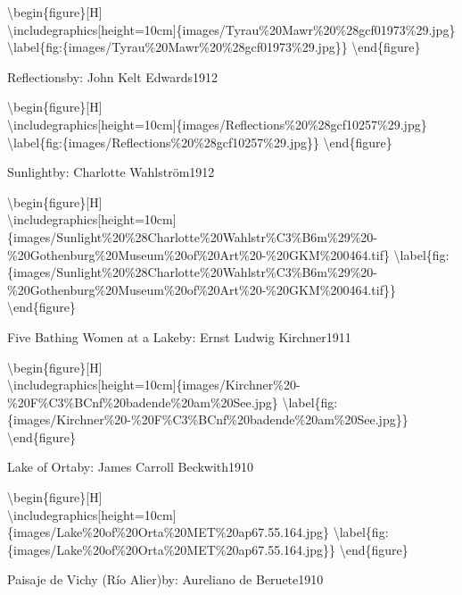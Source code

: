 \documentclass[
  a4paper,
]{book}
\begin{document}
\textbackslash begin\{figure\}{[}H{]}\\
\textbackslash includegraphics{[}height=10cm{]}\{images/Tyrau\%20Mawr\%20\%28gcf01973\%29.jpg\}
\textbackslash label\{fig:\{images/Tyrau\%20Mawr\%20\%28gcf01973\%29.jpg\}\}
\textbackslash end\{figure\}

\label{http:ux2fux2fwww.wikidata.orgux2fentityux2fQ76997813}
Reflectionsby: John Kelt Edwards1912

\textbackslash begin\{figure\}{[}H{]}\\
\textbackslash includegraphics{[}height=10cm{]}\{images/Reflections\%20\%28gcf10257\%29.jpg\}
\textbackslash label\{fig:\{images/Reflections\%20\%28gcf10257\%29.jpg\}\}
\textbackslash end\{figure\}

\label{http:ux2fux2fwww.wikidata.orgux2fentityux2fQ131100175}
Sunlightby: Charlotte Wahlström1912

\textbackslash begin\{figure\}{[}H{]}\\
\textbackslash includegraphics{[}height=10cm{]}\{images/Sunlight\%20\%28Charlotte\%20Wahlstr\%C3\%B6m\%29\%20-\%20Gothenburg\%20Museum\%20of\%20Art\%20-\%20GKM\%200464.tif\}
\textbackslash label\{fig:\{images/Sunlight\%20\%28Charlotte\%20Wahlstr\%C3\%B6m\%29\%20-\%20Gothenburg\%20Museum\%20of\%20Art\%20-\%20GKM\%200464.tif\}\}
\textbackslash end\{figure\}

\label{http:ux2fux2fwww.wikidata.orgux2fentityux2fQ8563481}
Five Bathing Women at a Lakeby: Ernst Ludwig Kirchner1911

\textbackslash begin\{figure\}{[}H{]}\\
\textbackslash includegraphics{[}height=10cm{]}\{images/Kirchner\%20-\%20F\%C3\%BCnf\%20badende\%20am\%20See.jpg\}
\textbackslash label\{fig:\{images/Kirchner\%20-\%20F\%C3\%BCnf\%20badende\%20am\%20See.jpg\}\}
\textbackslash end\{figure\}

\label{http:ux2fux2fwww.wikidata.orgux2fentityux2fQ19925715}
Lake of Ortaby: James Carroll Beckwith1910

\textbackslash begin\{figure\}{[}H{]}\\
\textbackslash includegraphics{[}height=10cm{]}\{images/Lake\%20of\%20Orta\%20MET\%20ap67.55.164.jpg\}
\textbackslash label\{fig:\{images/Lake\%20of\%20Orta\%20MET\%20ap67.55.164.jpg\}\}
\textbackslash end\{figure\}

\label{http:ux2fux2fwww.wikidata.orgux2fentityux2fQ65960306}
Paisaje de Vichy (Río Alier)by: Aureliano de Beruete1910
\end{document}
